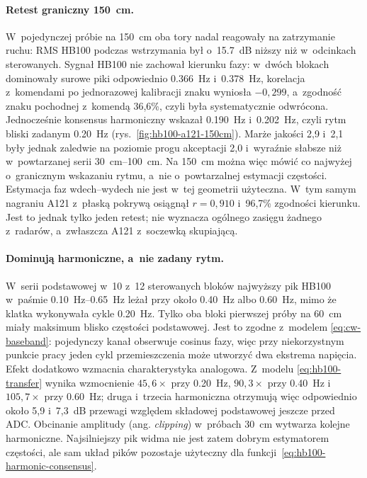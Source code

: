 \documentclass[12pt,a4paper,oneside]{report}
\begin{document}
\paragraph{Retest graniczny \SI{150}{cm}.} W~pojedynczej próbie na
\SI{150}{cm} oba tory nadal reagowały na zatrzymanie ruchu: RMS HB100 podczas
wstrzymania był o~\SI{15.7}{dB} niższy niż w~odcinkach sterowanych. Sygnał
HB100 nie zachował kierunku fazy: w~dwóch blokach dominowały surowe piki
odpowiednio \SI{0.366}{Hz} i~\SI{0.378}{Hz}, korelacja z~komendami po
jednorazowej kalibracji znaku wyniosła $-0{,}299$, a~zgodność znaku pochodnej
z~komendą 36,6\%, czyli była systematycznie odwrócona. Jednocześnie konsensus harmoniczny wskazał
\SI{0.190}{Hz} i~\SI{0.202}{Hz}, czyli rytm bliski zadanym \SI{0.20}{Hz}
(rys.~\ref{fig:hb100-a121-150cm}). Marże jakości 2,9 i~2,1 były jednak
zaledwie na poziomie progu akceptacji 2,0 i~wyraźnie słabsze niż w~powtarzanej
serii \SIrange{30}{100}{cm}. Na \SI{150}{cm} można więc mówić co najwyżej
o~granicznym wskazaniu rytmu, a~nie o~powtarzalnej estymacji częstości.
Estymacja faz wdech--wydech nie jest w~tej geometrii użyteczna. W~tym samym
nagraniu A121 z~płaską pokrywą osiągnął $r=0{,}910$ i~96,7\% zgodności
kierunku. Jest to jednak tylko jeden retest; nie wyznacza ogólnego zasięgu
żadnego z~radarów, a~zwłaszcza A121 z~soczewką skupiającą.

\paragraph{Dominują harmoniczne, a~nie zadany rytm.} W~serii podstawowej w~10 z~12 sterowanych
bloków najwyższy pik HB100 w~paśmie \SIrange{0.10}{0.65}{Hz} leżał przy
około \SI{0.40}{Hz} albo \SI{0.60}{Hz}, mimo że klatka wykonywała cykle
\SI{0.20}{Hz}. Tylko oba bloki pierwszej próby na \SI{60}{cm} miały maksimum
blisko częstości podstawowej. Jest to zgodne z~modelem
\eqref{eq:cw-baseband}: pojedynczy kanał obserwuje cosinus fazy, więc przy
niekorzystnym punkcie pracy jeden cykl przemieszczenia może utworzyć dwa
ekstrema napięcia. Efekt dodatkowo wzmacnia charakterystyka analogowa. Z~modelu
\eqref{eq:hb100-transfer} wynika wzmocnienie $45{,}6\times$ przy
\SI{0.20}{Hz}, $90{,}3\times$ przy \SI{0.40}{Hz} i~$105{,}7\times$ przy
\SI{0.60}{Hz}; druga i~trzecia harmoniczna otrzymują więc odpowiednio około
5,9 i~7,3~dB przewagi względem składowej podstawowej jeszcze przed ADC.
Obcinanie amplitudy (ang. \emph{clipping}) w~próbach \SI{30}{cm} wytwarza
kolejne harmoniczne. Najsilniejszy pik widma nie jest zatem dobrym estymatorem
częstości, ale sam układ pików pozostaje użyteczny dla
funkcji~\eqref{eq:hb100-harmonic-consensus}.
\end{document}
